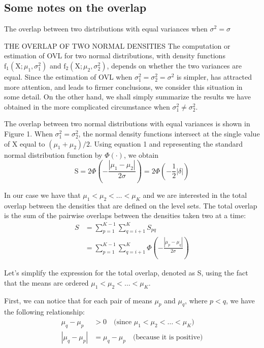 \documentclass[11pt]{amsart}
\begin{document}
\subsection{Some notes on the overlap}

The overlap between two distributions with equal variances when $\sigma^2 = \sigma$


THE OVERLAP OF TWO NORMAL DENSITIES
The computation or estimation of OVL for two normal distributions, with density functions $\mathrm{f}_1\left(\mathrm{X} ; \mu_1, \sigma_1^2\right)$ and $\mathrm{f}_2\left(\mathrm{X} ; \mu_2, \sigma_2^2\right)$, depends on whether the two variances are equal. Since the estimation of OVL when $\sigma_1^2=\sigma_2^2=\sigma^2$ is simpler, has attracted more attention, and leads to firmer conclusions, we consider this situation in some detail. On the other hand, we shall simply summarize the results we have obtained in the more complicated circumstance when $\sigma_1^2 \neq \sigma_2^2$.

The overlap between two normal distributions with equal variances is shown in Figure 1. When $\sigma_1^2=\sigma_2^2$, the normal density functions intersect at the single value of $\mathrm{X}$ equal to $\left(\mu_1+\mu_2\right) / 2$. Using equation 1 and representing the standard normal distribution function by $\Phi(\cdot)$, we obtain
$$
\mathrm{S}=2 \Phi\left(-\frac{\left|\mu_1-\mu_2\right|}{2 \sigma}\right)=2 \Phi\left(-\frac{1}{2}|\delta|\right)
$$

In our case we have that $\mu_1 < \mu_2 < \ldots < \mu_K$ and we are interested in the total overlap between the densities that are defined on the level sets. The total overlap is the sum of the pairwise overlaps between the densities taken two at a time:
\begin{align}
S &= \sum_{p=1}^{K-1} \sum_{q=i+1}^K S_{pq} \nonumber \\
&= \sum_{p=1}^{K-1} \sum_{q=i+1}^K  \Phi\left(-\frac{\left|\mu_p-\mu_q \right|}{2 \sigma}\right)\end{align}


Let's simplify the expression for the total overlap, denoted as S, using the fact that the means are ordered $\mu_1 < \mu_2 < \ldots < \mu_K$.

First, we can notice that for each pair of means $\mu_p$ and $\mu_q$, where $p < q$, we have the following relationship:
\begin{align*}
\mu_q - \mu_p &> 0 \quad \text{(since } \mu_1 < \mu_2 < \ldots < \mu_K \text{)} \\
\left|\mu_q - \mu_p \right| &= \mu_q - \mu_p \quad \text{(because it is positive)}
\end{align*}
\end{document}
